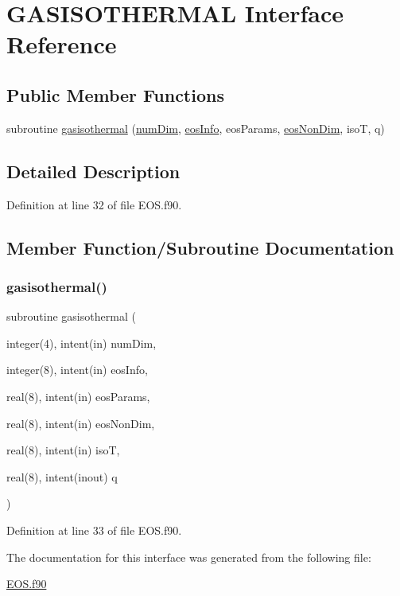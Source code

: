 \hypertarget{interfaceeos_1_1GASISOTHERMAL}{}\section{G\+A\+S\+I\+S\+O\+T\+H\+E\+R\+M\+AL Interface Reference}
\label{interfaceeos_1_1GASISOTHERMAL}
\subsection*{Public Member Functions}
\begin{DoxyCompactItemize}
\item 
subroutine \hyperlink{interfaceeos_1_1GASISOTHERMAL_a117ff85922806b5af3a2a2065fa2869d}{gasisothermal} (\hyperlink{SATKernels_8H_a680185db8546de161968dabace9e94f1}{num\+Dim}, \hyperlink{WENOKernels_8H_a9b67b225dd1b2bffc0623aa04a80bfc4}{eos\+Info}, eos\+Params, \hyperlink{WENOKernels_8H_ae84c458d3f8dce53d214eabcdc84b623}{eos\+Non\+Dim}, isoT, q)
\end{DoxyCompactItemize}


\subsection{Detailed Description}


Definition at line 32 of file E\+O\+S.\+f90.



\subsection{Member Function/\+Subroutine Documentation}
\hypertarget{interfaceeos_1_1GASISOTHERMAL_a117ff85922806b5af3a2a2065fa2869d}{}\label{interfaceeos_1_1GASISOTHERMAL_a117ff85922806b5af3a2a2065fa2869d} 
\subsubsection{\texorpdfstring{gasisothermal()}{gasisothermal()}}
{\footnotesize\ttfamily subroutine gasisothermal (\begin{DoxyParamCaption}\item[{integer(4), intent(in)}]{num\+Dim,  }\item[{integer(8), intent(in)}]{eos\+Info,  }\item[{real(8), intent(in)}]{eos\+Params,  }\item[{real(8), intent(in)}]{eos\+Non\+Dim,  }\item[{real(8), intent(in)}]{isoT,  }\item[{real(8), intent(inout)}]{q }\end{DoxyParamCaption})}



Definition at line 33 of file E\+O\+S.\+f90.



The documentation for this interface was generated from the following file\+:\begin{DoxyCompactItemize}
\item 
\hyperlink{EOS_8f90}{E\+O\+S.\+f90}\end{DoxyCompactItemize}
